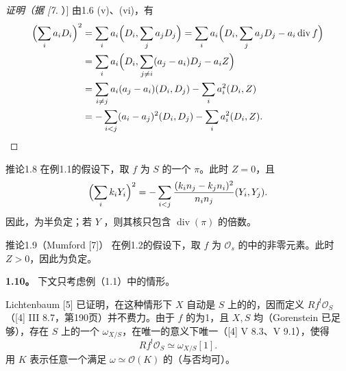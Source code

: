 \begin{proof}[证明（据 [7]）]
由1.6 (v)、(vi)，有
\begin{align*}
\Bigl(\sum_i a_iD_i\Bigr)^2
&=\sum_i a_i\Bigl(D_i,\sum_j a_jD_j\Bigr)
=\sum_i a_i\Bigl(D_i,\sum_j a_jD_j-a_i\operatorname{div}f\Bigr)\\
&=\sum_i a_i\Bigl(D_i,\sum_{j\ne i}(a_j-a_i)D_j-a_iZ\Bigr)\\
&=\sum_{i\ne j}a_i(a_j-a_i)(D_i,D_j)-\sum_i a_i^2(D_i,Z)\\
&=-\sum_{i<j}(a_i-a_j)^2(D_i,D_j)-\sum_i a_i^2(D_i,Z).
\end{align*}
\end{proof}
\begin{SGAresult}{推论}{1.8}
在例1.1的假设下，取 $f$ 为 $S$ 的一个 $\pi$。此时 $Z=0$，且
\[
\Bigl(\sum_i k_iY_i\Bigr)^2
=-\sum_{i<j}\frac{(k_in_j-k_jn_i)^2}{n_in_j}(Y_i,Y_j).
\]
因此，为半负定；若 $Y$ ，则其核只包含 $\operatorname{div}(\pi)$ 的倍数。
\end{SGAresult}
\begin{SGAresult}{推论}{1.9（Mumford [7]）}
在例1.2的假设下，取 $f$ 为 $\mathcal O_s$ 的中的非零元素。此时 $Z>0$，因此为负定。
\end{SGAresult}
\textbf{1.10。} 下文只考虑例（1.1）中的情形。

Lichtenbaum [5] 已证明，在这种情形下 $X$ 自动是 $S$ 上的的，因而定义 $Rf^!\mathcal O_S$（[4] III 8.7，第190页）并不费力。由于 $f$ 的为1，且 $X,S$ 均（Gorenstein 已足够），存在 $S$ 上的一个 $\omega_{X/S}$，在唯一的意义下唯一（[4] V 8.3、V 9.1），使得
\begin{equation}Rf^!\mathcal O_S\simeq\omega_{X/S}[1].\tag{1.10.1}\end{equation}
用 $K$ 表示任意一个满足 $\omega\simeq\mathcal O(K)$ 的（与否均可）。

